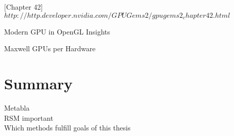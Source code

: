 \documentclass[thesis.tex]{subfiles}
\begin{document}
\cite{bib:GPUGems2}[Chapter 42] $http://http.developer.nvidia.com/GPUGems2/gpugems2_chapter42.html$

Modern GPU in OpenGL Insights \cite{bib:openglinsightsvoxel}

Maxwell GPUs per Hardware

\section{Summary}
Metabla\\
RSM important\\
Which methods fulfill goals of this thesis

\subfilebib %
\end{document}
